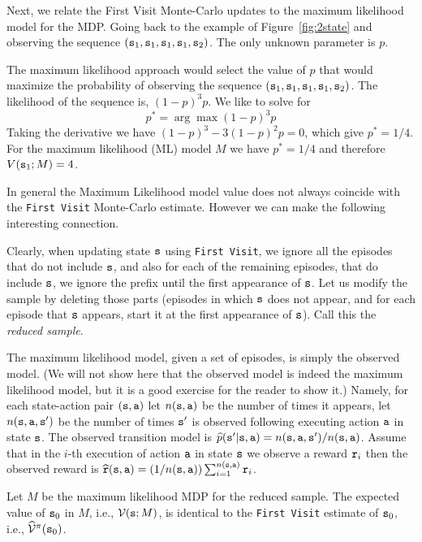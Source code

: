 Next, we relate the First Visit Monte-Carlo updates to the maximum
likelihood model for the MDP. Going back to the example of
Figure~\ref{fig:2state} and observing the sequence
$({\tt s}_1,{\tt s}_1,{\tt s}_1,{\tt s}_1,{\tt s}_2)$. The only unknown
parameter is $p$.

The maximum likelihood approach would select the value of $p$ that
would maximize the probability of observing the sequence
$({\tt s}_1,{\tt s}_1,{\tt s}_1,{\tt s}_1,{\tt s}_2)$. The likelihood of
the sequence is, $(1-p)^3p$. We like to solve for
\[
p^* = \arg\max (1-p)^3 p
\]
Taking the derivative we have $(1-p)^3-3(1-p)^2p=0$, which give
$p^*=1/4$.
%
For the maximum likelihood (ML) model $M$ we have $p^*=1/4$ and
therefore $V({\tt s}_1;M)=4$.

In general the Maximum Likelihood model value does not always
coincide with the {\tt First Visit} Monte-Carlo estimate. However we
can make the following interesting connection.

Clearly, when updating state ${\tt s}$ using {\tt First Visit}, we
ignore all the episodes that do not include ${\tt s}$, and also for
each of the remaining episodes, that do include ${\tt s}$, we ignore the
prefix until the first appearance of ${\tt s}$. Let us modify the
sample by deleting those parts (episodes in which ${\tt s}$ does not
appear, and for each episode that ${\tt s}$ appears, start it at the
first appearance of ${\tt s}$). Call this the {\em reduced sample}.

The maximum likelihood model, given a set of episodes, is simply the
observed model. (We will not show here that the observed model is
indeed the maximum likelihood model, but it is a good exercise for the reader to show it.) 
Namely, for each state-action
pair $({\tt s},{\tt a})$ let $n({\tt s},{\tt a})$ be the number of
times it appears, let $n({\tt s},{\tt a},{\tt s}')$ be the number of
times ${\tt s}'$ is observed following executing action ${\tt a}$ in
state ${\tt s}$. The observed transition model is
$\widehat{p}({\tt s}'|{\tt s},{\tt a})=n({\tt s},{\tt a},{\tt s}')/n({\tt s},{\tt a})$.
Assume that in the $i$-th execution of action ${\tt a}$ in state
${\tt s}$ we observe a reward ${\tt r}_i$ then the observed reward is
$\widehat{{\tt r}}({\tt s},{\tt a})=(1/n({\tt s},{\tt a}))\sum_{i=1}^{n({\tt s},{\tt a})}
{\tt r}_i$.

\begin{theorem}
\label{thm:MC-ML}
%
Let $M$ be the maximum likelihood MDP for the reduced sample. The
expected value of ${\tt s}_0$ in $M$, i.e., $\mathcal{V}({\tt s};M)$, is
identical to the {\tt First Visit} estimate of ${\tt s}_0$, i.e.,
$\widehat{\mathcal{V}}^\pi({\tt s}_0)$.
\end{theorem}

